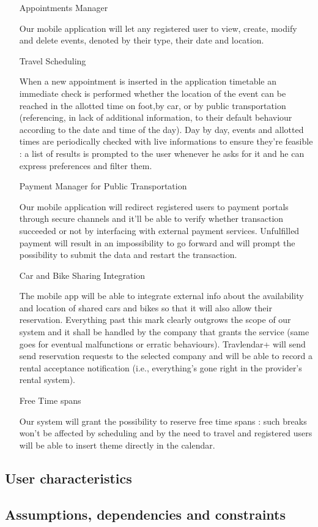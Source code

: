 		\begin{enumerate}

		\item[Appointments Manager]
		
Our mobile application will let any registered user to view, create, modify and delete events, denoted by their type, their date and location. \\

		\item[Travel Scheduling]

When a new appointment is inserted in the application timetable an immediate check is performed whether the location of the event can be reached in the allotted time on foot,by car, or by public transportation (referencing, in lack of additional information, to their default behaviour according to the date and time of the day).
Day by day, events and allotted times are periodically checked with live informations to ensure they’re feasible : a list of results is prompted to the user whenever he asks for it and he can express preferences and filter them.\\

		\item[Payment Manager for Public Transportation]

Our mobile application will redirect registered users to payment portals through secure channels and it’ll be able to verify whether transaction succeeded or not by interfacing with external payment services.
Unfulfilled payment will result in an impossibility to go forward and will prompt the possibility to submit the data and restart the transaction.\\

		\item[Car and Bike Sharing Integration]

The mobile app will be able to integrate external info about the availability and location of shared cars and bikes so that it will also allow their reservation.
Everything past this mark clearly outgrows the scope of our system and it shall be handled by the company that grants the service (same goes for eventual malfunctions or erratic behaviours). 
Travlendar+ will send send reservation requests to the selected company and will be able to record a rental acceptance notification (i.e., everything’s gone right in the provider’s rental system).\\


		\item[Free Time spans]

Our system will grant the possibility to reserve free time spans : such breaks won’t be affected by scheduling and by the need to travel and registered users will be able to insert theme directly in the calendar.\\

		\end{enumerate}

			
		\subsection{User characteristics}
			
		\subsection{Assumptions, dependencies and constraints}
